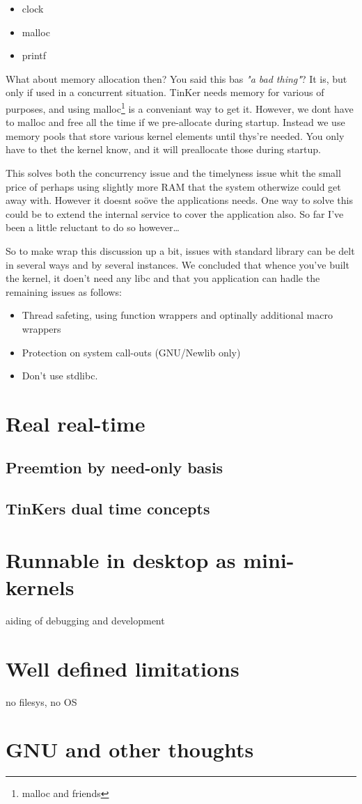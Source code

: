 \begin{itemize}
	\item clock
	\item malloc
	\item printf
\end{itemize}
What about memory allocation then? You said this bas \textit{"a bad thing"}? It is, but only if used in a concurrent situation. TinKer needs memory for various of purposes, and using malloc\footnote{malloc and friends} is a conveniant way to get it. However, we dont have to malloc and free all the time if we pre-allocate during startup. Instead we use memory pools that store various kernel elements until thys're needed. You only have to thet the kernel know, and it will preallocate those during startup. 

This solves both the concurrency issue and the timelyness issue whit the small price of perhaps using slightly more RAM that the system otherwize could get away with.  However it doesnt soöve the applications needs. One way to solve this could be to extend the internal service to cover the application also. So far I've been a little reluctant to do so however\ldots

So to make wrap this discussion up a bit, issues with standard library can be delt in several ways and by several instances. We concluded that whence you've built the kernel, it doen't need any libc and that you application can hadle the remaining issues as follows:

\begin{itemize}
	\item Thread safeting, using function wrappers and optinally additional macro wrappers
	\item Protection on system call-outs (GNU/Newlib only)
	\item Don't use stdlibc.
\end{itemize}




\chapter{Real real-time}

\section{Preemtion by need-only basis}
\section{TinKers dual time concepts}

\chapter{Runnable in desktop as mini-kernels}
aiding of debugging and development

\chapter{Well defined limitations}
no filesys, no OS

\chapter{GNU and other thoughts}